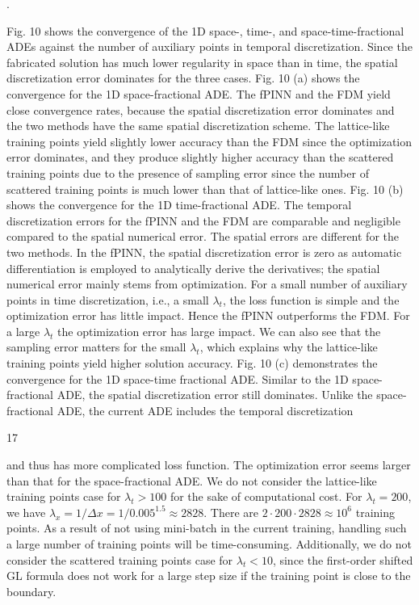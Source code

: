 \documentclass[UTF8]{article}
\begin{document}
.

Fig. 10 shows the convergence of the 1D space-, time-, and space-time-fractional ADEs against the number of auxiliary points in temporal discretization. Since the fabricated solution has much lower regularity in space than in time, the spatial discretization error dominates for the three cases. Fig. 10 (a) shows the convergence for the 1D space-fractional ADE. The fPINN and the FDM yield close convergence rates, because the spatial discretization error dominates and the two methods have the same spatial discretization scheme. The lattice-like training points yield slightly lower accuracy than the FDM since the optimization error dominates, and they produce slightly higher accuracy than the scattered training points due to the presence of sampling error since the number of scattered training points is much lower than that of lattice-like ones. Fig. 10 (b) shows the convergence for the 1D time-fractional ADE. The temporal discretization errors for the fPINN and the FDM are comparable and negligible compared to the spatial numerical error. The spatial errors are different for the two methods. In the fPINN, the spatial discretization error is zero as automatic differentiation is employed to analytically derive the derivatives; the spatial numerical error mainly stems from optimization. For a small number of auxiliary points in time discretization, i.e., a small $\lambda_t$, the loss function is simple and the optimization error has little impact. Hence the fPINN outperforms the FDM. For a large $\lambda_t$ the optimization error has large impact. We can also see that the sampling error matters for the small $\lambda_t$, which explains why the lattice-like training points yield higher solution accuracy. Fig. 10 (c) demonstrates the convergence for the 1D space-time fractional ADE. Similar to the 1D space-fractional ADE, the spatial discretization error still dominates. Unlike the space-fractional ADE, the current ADE includes the temporal discretization

\begin{center}
17
\end{center}

and thus has more complicated loss function. The optimization error seems larger than that for the space-fractional ADE. We do not consider the lattice-like training points case for $\lambda_t > 100$ for the sake of computational cost. For $\lambda_t = 200$, we have $\lambda_x = 1/\Delta x = 1/0.005^{1.5} \approx 2828$. There are $2 \cdot 200 \cdot 2828 \approx 10^6$ training points. As a result of not using mini-batch in the current training, handling such a large number of training points will be time-consuming. Additionally, we do not consider the scattered training points case for $\lambda_t < 10$, since the first-order shifted GL formula does not work for a large step size if the training point is close to the boundary.
\end{document}
